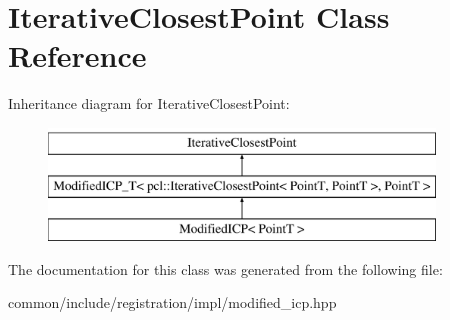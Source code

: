 \hypertarget{classpcl_1_1IterativeClosestPoint}{
\section{IterativeClosestPoint Class Reference}
\label{classpcl_1_1IterativeClosestPoint}
}
Inheritance diagram for IterativeClosestPoint:\begin{figure}[H]
\begin{center}
\leavevmode
\includegraphics[height=3.000000cm]{classpcl_1_1IterativeClosestPoint}
\end{center}
\end{figure}


The documentation for this class was generated from the following file:\begin{DoxyCompactItemize}
\item 
common/include/registration/impl/modified\_\-icp.hpp\end{DoxyCompactItemize}
